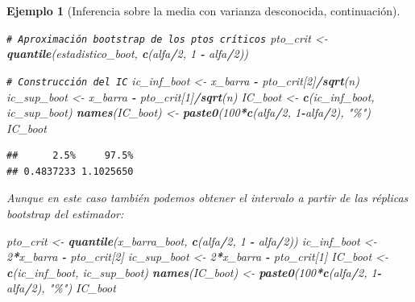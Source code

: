 \documentclass[
]{book}
\newenvironment{Shaded}{\begin{snugshade}}{\end{snugshade}}
\newcommand{\CommentTok}[1]{\textcolor[rgb]{0.56,0.35,0.01}{\textit{#1}}}
\newcommand{\DecValTok}[1]{\textcolor[rgb]{0.00,0.00,0.81}{#1}}
\newcommand{\FunctionTok}[1]{\textcolor[rgb]{0.13,0.29,0.53}{\textbf{#1}}}
\newcommand{\NormalTok}[1]{#1}
\newcommand{\OtherTok}[1]{\textcolor[rgb]{0.56,0.35,0.01}{#1}}
\newcommand{\SpecialCharTok}[1]{\textcolor[rgb]{0.81,0.36,0.00}{\textbf{#1}}}
\newcommand{\StringTok}[1]{\textcolor[rgb]{0.31,0.60,0.02}{#1}}
\theoremstyle{break}
\newtheorem{example}{Ejemplo}[chapter]
\theoremstyle{nonumberplain}
\renewcommand{\CommentTok}[1]{\textcolor[rgb]{0.41,0.41,0.41}{\texttt{#1}}}
\begin{document}
\begin{example}[Inferencia sobre la media con varianza desconocida, continuación]
\begin{Shaded}
\begin{Highlighting}[]
\CommentTok{\# Aproximación bootstrap de los ptos críticos}
\NormalTok{pto\_crit }\OtherTok{\textless{}{-}} \FunctionTok{quantile}\NormalTok{(estadistico\_boot, }\FunctionTok{c}\NormalTok{(alfa}\SpecialCharTok{/}\DecValTok{2}\NormalTok{, }\DecValTok{1} \SpecialCharTok{{-}}\NormalTok{ alfa}\SpecialCharTok{/}\DecValTok{2}\NormalTok{))}

\CommentTok{\# Construcción del IC}
\NormalTok{ic\_inf\_boot }\OtherTok{\textless{}{-}}\NormalTok{ x\_barra }\SpecialCharTok{{-}}\NormalTok{ pto\_crit[}\DecValTok{2}\NormalTok{]}\SpecialCharTok{/}\FunctionTok{sqrt}\NormalTok{(n)}
\NormalTok{ic\_sup\_boot }\OtherTok{\textless{}{-}}\NormalTok{ x\_barra }\SpecialCharTok{{-}}\NormalTok{ pto\_crit[}\DecValTok{1}\NormalTok{]}\SpecialCharTok{/}\FunctionTok{sqrt}\NormalTok{(n)}
\NormalTok{IC\_boot }\OtherTok{\textless{}{-}} \FunctionTok{c}\NormalTok{(ic\_inf\_boot, ic\_sup\_boot)}
\FunctionTok{names}\NormalTok{(IC\_boot) }\OtherTok{\textless{}{-}} \FunctionTok{paste0}\NormalTok{(}\DecValTok{100}\SpecialCharTok{*}\FunctionTok{c}\NormalTok{(alfa}\SpecialCharTok{/}\DecValTok{2}\NormalTok{, }\DecValTok{1}\SpecialCharTok{{-}}\NormalTok{alfa}\SpecialCharTok{/}\DecValTok{2}\NormalTok{), }\StringTok{"\%"}\NormalTok{)}
\NormalTok{IC\_boot}
\end{Highlighting}
\end{Shaded}

\begin{verbatim}
##      2.5%     97.5% 
## 0.4837233 1.1025650
\end{verbatim}

Aunque en este caso también podemos obtener el intervalo a
partir de las réplicas bootstrap del estimador:

\begin{Shaded}
\begin{Highlighting}[]
\NormalTok{pto\_crit }\OtherTok{\textless{}{-}} \FunctionTok{quantile}\NormalTok{(x\_barra\_boot, }\FunctionTok{c}\NormalTok{(alfa}\SpecialCharTok{/}\DecValTok{2}\NormalTok{, }\DecValTok{1} \SpecialCharTok{{-}}\NormalTok{ alfa}\SpecialCharTok{/}\DecValTok{2}\NormalTok{))}
\NormalTok{ic\_inf\_boot }\OtherTok{\textless{}{-}} \DecValTok{2}\SpecialCharTok{*}\NormalTok{x\_barra }\SpecialCharTok{{-}}\NormalTok{ pto\_crit[}\DecValTok{2}\NormalTok{]}
\NormalTok{ic\_sup\_boot }\OtherTok{\textless{}{-}} \DecValTok{2}\SpecialCharTok{*}\NormalTok{x\_barra }\SpecialCharTok{{-}}\NormalTok{ pto\_crit[}\DecValTok{1}\NormalTok{]}
\NormalTok{IC\_boot }\OtherTok{\textless{}{-}} \FunctionTok{c}\NormalTok{(ic\_inf\_boot, ic\_sup\_boot)}
\FunctionTok{names}\NormalTok{(IC\_boot) }\OtherTok{\textless{}{-}} \FunctionTok{paste0}\NormalTok{(}\DecValTok{100}\SpecialCharTok{*}\FunctionTok{c}\NormalTok{(alfa}\SpecialCharTok{/}\DecValTok{2}\NormalTok{, }\DecValTok{1}\SpecialCharTok{{-}}\NormalTok{alfa}\SpecialCharTok{/}\DecValTok{2}\NormalTok{), }\StringTok{"\%"}\NormalTok{)}
\NormalTok{IC\_boot}
\end{Highlighting}
\end{Shaded}


\end{example}
\end{document}
